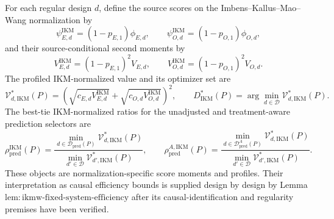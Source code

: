 For each regular design \(d\), define the source scores on the Imbens--Kallus--Mao--Wang normalization by
\[
 \psi_{E,d}^{\mathrm{IKM}}=(1-p_{E,1})\phi_{E,d},
 \qquad
 \psi_{O,d}^{\mathrm{IKM}}=(1-p_{O,1})\phi_{O,d},
\]
and their source-conditional second moments by
\[
 V_{E,d}^{\mathrm{IKM}}=(1-p_{E,1})^2V_{E,d},
 \qquad
 V_{O,d}^{\mathrm{IKM}}=(1-p_{O,1})^2V_{O,d}.
\]
The profiled IKM-normalized value and its optimizer set are
\[
 \mathcal V_{d,\mathrm{IKM}}^*(P)
 =\left(\sqrt{c_{E,d}V_{E,d}^{\mathrm{IKM}}}
 +\sqrt{c_{O,d}V_{O,d}^{\mathrm{IKM}}}\right)^2,
 \qquad
 D_{\mathrm{IKM}}^*(P)=\arg\min_{d\in\mathcal D}\mathcal V_{d,\mathrm{IKM}}^*(P).
\]
The best-tie IKM-normalized ratios for the unadjusted and treatment-aware prediction selectors are
\[
 \rho_{\mathrm{pred}}^{\mathrm{IKM}}(P)
 =\frac{\min_{d\in\mathcal D_{\mathrm{pred}}(P)}\mathcal V_{d,\mathrm{IKM}}^*(P)}
 {\min_{d'\in\mathcal D}\mathcal V_{d',\mathrm{IKM}}^*(P)},
 \qquad
 \rho_{\mathrm{pred}}^{A,\mathrm{IKM}}(P)
 =\frac{\min_{d\in\mathcal D_{\mathrm{pred}}^A(P)}\mathcal V_{d,\mathrm{IKM}}^*(P)}
 {\min_{d'\in\mathcal D}\mathcal V_{d',\mathrm{IKM}}^*(P)}.
\]
These objects are normalization-specific score moments and profiles.  Their interpretation as causal efficiency bounds is supplied design by design by Lemma~\(\mathrm{lem{:}ikmw\text{-}fixed\text{-}system\text{-}efficiency}\) after its causal-identification and regularity premises have been verified.